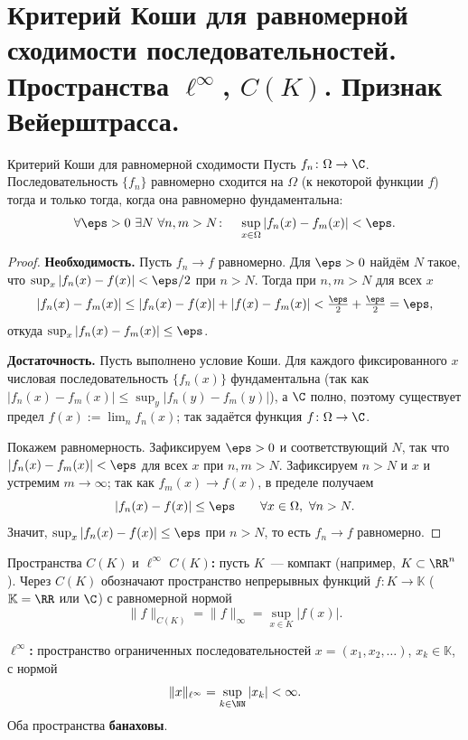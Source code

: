 
\section{Критерий Коши для равномерной сходимости последовательностей. Пространства $\ell^\infty$, $C(K)$. Признак Вейерштрасса.}

\begin{Theorem}[required]{Критерий Коши для равномерной сходимости}{}
	Пусть $f_n \colon \Omega \to \C$. Последовательность $\{f_n\}$ равномерно сходится на $\Omega$ (к некоторой функции $f$) тогда и только тогда, когда она равномерно фундаментальна:
	\[
	\forall \eps > 0\ \exists N\ \forall n, m > N \colon \quad \sup_{x \in \Omega} |f_n(x) - f_m(x)| < \eps.
	\]
\end{Theorem}

\begin{proof}
	\textbf{Необходимость.} Пусть $f_n \to f$ равномерно. Для $\eps > 0$ найдём $N$ такое, что $\sup_x |f_n(x) - f(x)| < \eps/2$ при $n > N$. Тогда при $n, m > N$ для всех $x$
	\[
	|f_n(x) - f_m(x)| \le |f_n(x) - f(x)| + |f(x) - f_m(x)| < \tfrac{\eps}{2} + \tfrac{\eps}{2} = \eps,
	\]
	откуда $\sup_x |f_n(x) - f_m(x)| \le \eps$. %

	\textbf{Достаточность.} Пусть выполнено условие Коши. Для каждого фиксированного $x$ числовая последовательность $\{f_n(x)\}$ фундаментальна (так как $|f_n(x) - f_m(x)| \le \sup_y|f_n(y)-f_m(y)|$), а $\C$ полно, поэтому существует предел $f(x) := \lim_n f_n(x)$; так задаётся функция $f \colon \Omega \to \C$.

	Покажем равномерность. Зафиксируем $\eps > 0$ и соответствующий $N$, так что $|f_n(x) - f_m(x)| < \eps$ для всех $x$ при $n, m > N$. Зафиксируем $n > N$ и $x$ и устремим $m \to \infty$; так как $f_m(x) \to f(x)$, в пределе получаем
	\[
	|f_n(x) - f(x)| \le \eps \qquad \forall x \in \Omega,\ \forall n > N.
	\]
	Значит, $\sup_x |f_n(x) - f(x)| \le \eps$ при $n > N$, то есть $f_n \to f$ равномерно.
\end{proof}

\begin{Definition}{Пространства $C(K)$ и $\ell^\infty$}{}
	\textbf{$C(K)$:} пусть $K$~--- компакт (например, $K \subset \RR^n$). Через $C(K)$ обозначают пространство непрерывных функций $f \colon K \to \mathbb{K}$ ($\mathbb{K} = \RR$ или $\C$) с равномерной нормой
	\[
	\|f\|_{C(K)} = \|f\|_{\infty} = \sup_{x \in K} |f(x)|.
	\]

	\textbf{$\ell^\infty$:} пространство ограниченных последовательностей $x = (x_1, x_2, \ldots)$, $x_k \in \mathbb{K}$, с нормой
	\[
	\|x\|_{\ell^\infty} = \sup_{k \in \NN} |x_k| < \infty.
	\]
	Оба пространства \textbf{банаховы}.
\end{Definition}

